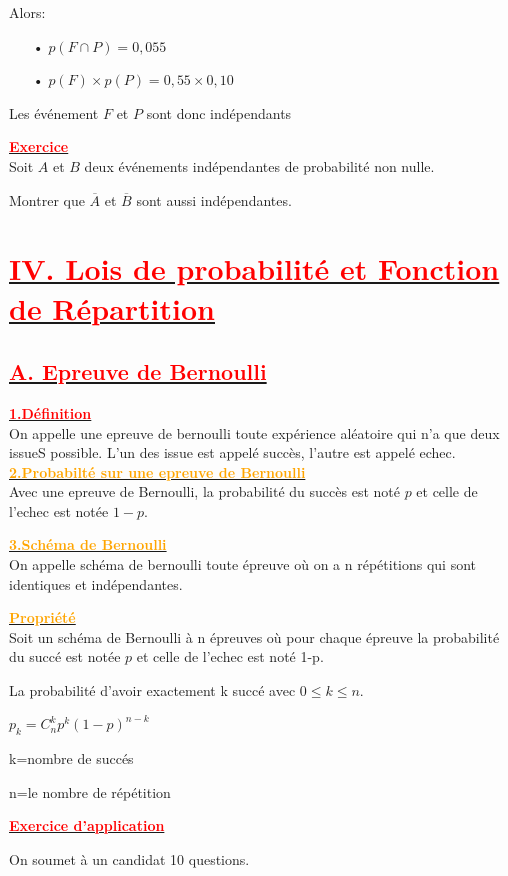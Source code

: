\documentclass[12pt]{article}
\begin{document}
Alors:
\begin{itemize}
\item[•] $p(F\cap P)=0,055$
\item[•] $p(F)\times p(P)=0,55\times 0,10$
\end{itemize}
Les événement $F$ et $P$ sont donc indépendants

\underline{\textbf{\textcolor{red}{Exercice}}}\\
Soit $A$ et $B$ deux événements indépendantes de probabilité non nulle.

Montrer que $\overline{A}$ et $\overline{B}$ sont aussi indépendantes.
\section*{\underline{\textbf{\textcolor{red}{IV. Lois de probabilité et Fonction de Répartition}}}}
\subsection*{\underline{\textbf{\textcolor{red}{A. Epreuve de Bernoulli}}}}
\underline{\textbf{\textcolor{red}{1.Définition}}}\\
On appelle une epreuve de bernoulli toute expérience aléatoire qui n'a que deux issueS possible. L'un des issue est appelé succès, l'autre est appelé echec.
\underline{\textbf{\textcolor{orange}{2.Probabilté sur une epreuve de Bernoulli}}}\\
Avec une epreuve de Bernoulli, la probabilité du succès est noté $p$ et celle de l'echec est notée $1-p$.

\underline{\textbf{\textcolor{orange}{3.Schéma de Bernoulli}}}\\
On appelle schéma de bernoulli toute épreuve où on a n répétitions qui sont identiques et indépendantes.

\underline{\textbf{\textcolor{orange}{Propriété}}}\\
Soit un schéma de Bernoulli à n épreuves où pour chaque épreuve la probabilité du succé est notée $p$ et celle de l'echec est noté 1-p. 

La probabilité d'avoir exactement k succé avec $0\leq k\leq n$.

$p_{k}=C^{k}_{n}p^{k}(1-p)^{n-k}$

k=nombre de succés

n=le nombre de répétition

\underline{\textbf{\textcolor{red}{Exercice d'application}}}

On soumet à un candidat 10 questions.
\end{document}
